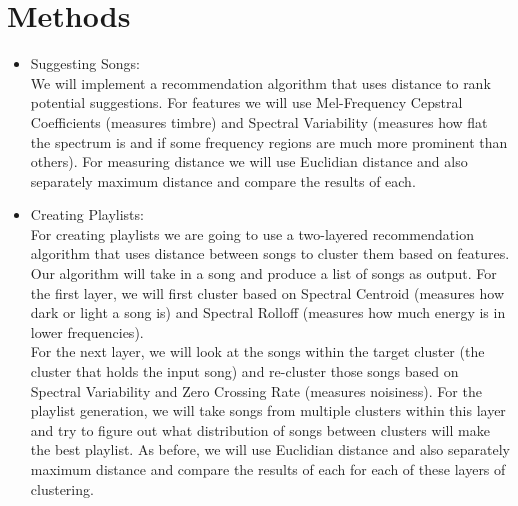 \documentclass[11pt]{article}
\begin{document}
\section{Methods}
\begin{itemize}


\item Suggesting Songs:\\
We will implement a recommendation algorithm that uses distance to rank potential suggestions. For features we will use Mel-Frequency Cepstral Coefficients (measures timbre) and Spectral Variability (measures how flat the spectrum is and if some frequency regions are much more prominent than others). For measuring distance we will use Euclidian distance and also separately maximum distance and compare the results of each.


\item Creating Playlists:\\
For creating playlists we are going to use a two-layered recommendation algorithm that uses distance between songs to cluster them based on features. Our algorithm will take in a song and produce a list of songs as output. For the first layer, we will first cluster based on Spectral Centroid (measures how dark or light a song is) and Spectral Rolloff (measures how much energy is in lower frequencies).\\
For the next layer, we will look at the songs within the target cluster (the cluster that holds the input song) and re-cluster those songs based on Spectral Variability and Zero Crossing Rate (measures noisiness). For the playlist generation, we will take songs from multiple clusters within this layer and try to figure out what distribution of songs between clusters will make the best playlist. As before, we will use Euclidian distance and also separately maximum distance and compare the results of each for each of these layers of clustering.


\end{itemize}
\end{document}
